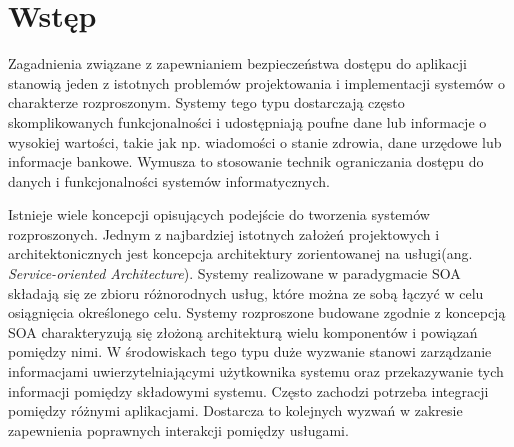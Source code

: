 \chapter{Wstęp}
\label{cha:wstep}


\label{sec:motywacje}

Zagadnienia związane z zapewnianiem bezpieczeństwa dostępu do aplikacji stanowią jeden z istotnych problemów projektowania i implementacji systemów o charakterze rozproszonym. Systemy tego typu dostarczają często skomplikowanych funkcjonalności i udostępniają poufne dane lub informacje o wysokiej wartości, takie jak np. wiadomości o stanie zdrowia, dane urzędowe lub informacje bankowe. Wymusza to stosowanie technik ograniczania dostępu do danych i funkcjonalności systemów informatycznych.

Istnieje wiele koncepcji opisujących podejście do tworzenia systemów rozproszonych. Jednym z najbardziej istotnych założeń projektowych i architektonicznych jest koncepcja architektury zorientowanej na usługi(ang. \textit{Service-oriented Architecture}). Systemy realizowane w paradygmacie SOA składają się ze zbioru różnorodnych usług, które można ze sobą łączyć w celu osiągnięcia określonego celu. Systemy rozproszone budowane zgodnie z koncepcją SOA charakteryzują się złożoną architekturą wielu komponentów i powiązań pomiędzy nimi. W środowiskach tego typu duże wyzwanie stanowi zarządzanie informacjami uwierzytelniającymi użytkownika systemu oraz przekazywanie tych informacji pomiędzy składowymi systemu. Często zachodzi potrzeba integracji pomiędzy różnymi aplikacjami. Dostarcza to kolejnych wyzwań w zakresie zapewnienia poprawnych interakcji pomiędzy usługami.

